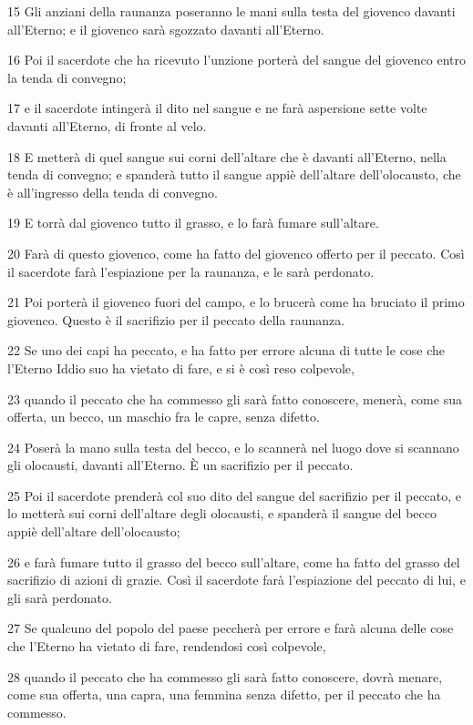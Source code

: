 \par 15 Gli anziani della raunanza poseranno le mani sulla testa del giovenco davanti all'Eterno; e il giovenco sarà sgozzato davanti all'Eterno.
\par 16 Poi il sacerdote che ha ricevuto l'unzione porterà del sangue del giovenco entro la tenda di convegno;
\par 17 e il sacerdote intingerà il dito nel sangue e ne farà aspersione sette volte davanti all'Eterno, di fronte al velo.
\par 18 E metterà di quel sangue sui corni dell'altare che è davanti all'Eterno, nella tenda di convegno; e spanderà tutto il sangue appiè dell'altare dell'olocausto, che è all'ingresso della tenda di convegno.
\par 19 E torrà dal giovenco tutto il grasso, e lo farà fumare sull'altare.
\par 20 Farà di questo giovenco, come ha fatto del giovenco offerto per il peccato. Così il sacerdote farà l'espiazione per la raunanza, e le sarà perdonato.
\par 21 Poi porterà il giovenco fuori del campo, e lo brucerà come ha bruciato il primo giovenco. Questo è il sacrifizio per il peccato della raunanza.
\par 22 Se uno dei capi ha peccato, e ha fatto per errore alcuna di tutte le cose che l'Eterno Iddio suo ha vietato di fare, e si è così reso colpevole,
\par 23 quando il peccato che ha commesso gli sarà fatto conoscere, menerà, come sua offerta, un becco, un maschio fra le capre, senza difetto.
\par 24 Poserà la mano sulla testa del becco, e lo scannerà nel luogo dove si scannano gli olocausti, davanti all'Eterno. È un sacrifizio per il peccato.
\par 25 Poi il sacerdote prenderà col suo dito del sangue del sacrifizio per il peccato, e lo metterà sui corni dell'altare degli olocausti, e spanderà il sangue del becco appiè dell'altare dell'olocausto;
\par 26 e farà fumare tutto il grasso del becco sull'altare, come ha fatto del grasso del sacrifizio di azioni di grazie. Così il sacerdote farà l'espiazione del peccato di lui, e gli sarà perdonato.
\par 27 Se qualcuno del popolo del paese peccherà per errore e farà alcuna delle cose che l'Eterno ha vietato di fare, rendendosi così colpevole,
\par 28 quando il peccato che ha commesso gli sarà fatto conoscere, dovrà menare, come sua offerta, una capra, una femmina senza difetto, per il peccato che ha commesso.
